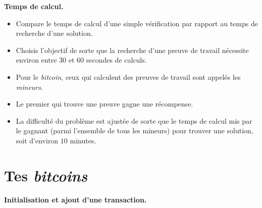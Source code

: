 \documentclass[12pt,class=report,crop=false]{standalone}
\begin{document}
\newpage   

 \textbf{Temps de calcul.}
   
   \begin{itemize}
   \item  Compare le temps de calcul d'une simple vérification par rapport au temps de recherche d'une solution. 
   
   \item Choisis l'objectif  de sorte que la recherche d'une preuve de travail nécessite environ entre 30 et 60 secondes de calculs.
  
  \item Pour le \emph{bitcoin}, ceux qui calculent des preuves de travail sont appelés les \emph{mineurs}. 
  
  \item Le premier qui trouve une preuve gagne une récompense. 
  
  \item La difficulté du problème est ajustée de sorte 
que le temps de calcul mis par le gagnant (parmi l'ensemble de tous les mineurs) pour trouver une solution, soit d'environ $10$ minutes.

  \end{itemize}

\newpage


\section*{Tes \emph{bitcoins}}


\newpage

\textbf{Initialisation et ajout d'une transaction.}
  
\end{document}
